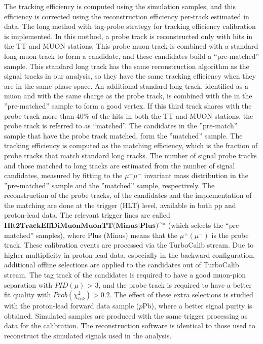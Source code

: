 The tracking efficiency is computed using the simulation samples, and this efficiency is corrected using the reconstruction efficiency per-track estimated in data. The long method with tag-probe strategy for tracking efficiency calibration is implemented. In this method, a probe track is reconstructed only with hits in the TT and MUON stations. This probe muon track is combined with a standard long muon track to form a \jpsi candidate, and these candidates build a “pre-matched” sample. This standard long track has the same reconstruction algorithm as the signal tracks in our analysis, so they have the same tracking efficiency when they are in the same phase space. 
An additional standard long track, identified as a muon and with the same charge as the probe track, is combined with the \jpsi in the ”pre-matched” sample to form a good vertex. If this third track shares with the probe track more than $40\%$ of the hits in both the TT and MUON stations, the probe track is referred to as “matched”. The \jpsi candidates in the ”pre-match” sample that have the probe track matched, form the ”matched” sample. 
The tracking efficiency is computed as the matching efficiency, which is the fraction of probe tracks that match standard long tracks. The number of signal probe tracks and those matched to long tracks are estimated from the number of \jpsi signal candidates, measured by fitting to the $\mu^+\mu^-$ invariant mass distribution in the ”pre-matched” sample and the ”matched” sample, respectively. The reconstruction of the probe tracks, of the \jpsi candidates and the implementation of the matching are done at the trigger (HLT) level, available in both pp and proton-lead data. The relevant trigger lines are called $\textbf{Hlt2TrackEffDiMuonMuonTT(Minus|Plus)^*}$ (which selects the “pre-matched” samples), where Plus (Minus) means that the $\mu^+(\mu^-)$ is the probe track. These calibration events are processed via the TurboCalib stream. Due to higher multiplicity in proton-lead data, especially in the backward configuration, additional offline selections are applied to the \jpsi candidates out of TurboCalib stream. The tag track of the \jpsi candidates is required to have a good muon-pion separation with $PID(\mu)$ > 3, and the probe track is required to have a better fit quality with $Prob(\chi_{trk}^2) > 0.2$. The effect of these extra selections is studied with the proton-lead forward data sample ($p$Pb), where a better signal purity is obtained. 
Simulated \jpsi samples are produced with the same trigger processing as data for the calibration. The reconstruction software is identical to those used to reconstruct the simulated signals used in the analysis. 
